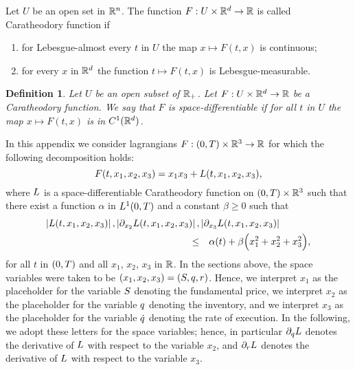 \documentclass[10pt,a4paper]{article}
\newtheorem{defi}[thm]{Definition}
\begin{document}
\begin{appendices}
Let $U$ be an open set in $\mathbb{R}^{n}$. The function $F:U\times \mathbb{R}^{d} \rightarrow \mathbb{R}$ is called Caratheodory function  if
\begin{enumerate}
	\item for Lebesgue-almost every $t$ in $U$ the map $x \mapsto F(t,x)$ is continuous;
	\item for every $x$ in $\mathbb{R}^{d}$ the function $t\mapsto F(t,x)$ is Lebesgue-measurable. 
\end{enumerate}
\begin{defi}
	Let  $U$ be an open subset of $\mathbb{R}_+$. Let $F:U\times \mathbb{R}^{d} \rightarrow \mathbb{R}$ be a  Caratheodory function. We say that $F$ is space-differentiable if for all $t$ in $U$ the map $x\mapsto F(t,x)$ is in $C^{1}(\mathbb{R}^{d})$. 
\end{defi}
In this appendix we consider lagrangians $F:(0,T)\times \mathbb{R}^{3} \rightarrow \mathbb{R}$ for which the following decomposition holds:
\begin{equation}\label{eq.abstractDecompositionOfLagrangian}
F(t,x_1,x_2,x_3) = x_1 x_3 + L (t,x_1,x_2,x_3),
\end{equation}
where $L$ is a space-differentiable Caratheodory function on $(0,T)\times \mathbb{R}^{3}$ such that  there exist a function $\alpha$ in $L^{1}(0,T)$ and a constant $\beta\geq 0$ such that 
\begin{equation}
\label{eq.growthConditionOnLarangian}
\begin{split}
\left\lvert {L(t,x_1,x_2,x_3)} \right\rvert, 
\left\lvert {\partial_{x_2}L(t,x_1,x_2,x_3)} \right\rvert, &
\left\lvert {\partial_{x_3}L(t,x_1,x_2,x_3)} \right\rvert\\
\leq & \quad  \alpha(t) + \beta\Big(x_1^{2} + x_2^{2} + x_3^{2}\Big),
\end{split}
\end{equation}
for all $t$ in $(0,T)$ and all $x_1$,  $x_2$, $x_3$ in $\mathbb{R}$. 
In the sections above, the space variables were taken to be $(x_1,x_2,x_3) = (S,q,r)$. Hence, we interpret $x_1$ as the placeholder for the variable $S$ denoting the fundamental price, we interpret $x_2$ as the placeholder for the variable $q$ denoting the inventory, and we interpret $x_3$ as the placeholder for the variable $\dot{q}$ denoting the rate of execution. In the following, we adopt these letters for the space variables; hence, in particular $\partial_q L$ denotes the derivative of $L$ with respect to the variable $x_2$, and $\partial_r L$ denotes the derivative of $L$ with respect to the variable $x_3$.


\end{appendices}
\end{document}
